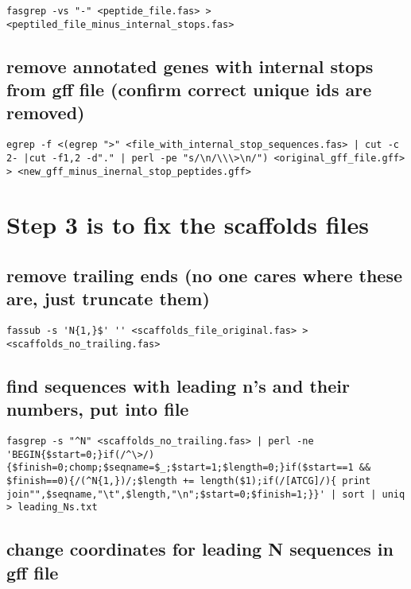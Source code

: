 \documentclass[11pt]{article}
\begin{document}
\begin{verbatim}
fasgrep -vs "-" <peptide_file.fas> > <peptiled_file_minus_internal_stops.fas>
\end{verbatim}


\subsection*{remove annotated genes with internal stops from gff file (confirm correct unique ids are removed)}
\label{sec-2.3}


\begin{verbatim}
egrep -f <(egrep ">" <file_with_internal_stop_sequences.fas> | cut -c 2- |cut -f1,2 -d"." | perl -pe "s/\n/\\\>\n/") <original_gff_file.gff> > <new_gff_minus_inernal_stop_peptides.gff>
\end{verbatim}


\section*{Step 3 is to fix the scaffolds files}
\label{sec-3}

\subsection*{remove trailing ends (no one cares where these are, just truncate them)}
\label{sec-3.1}


\begin{verbatim}
fassub -s 'N{1,}$' '' <scaffolds_file_original.fas> > <scaffolds_no_trailing.fas>
\end{verbatim}


\subsection*{find sequences with leading n's and their numbers, put into file}
\label{sec-3.2}


\begin{verbatim}
fasgrep -s "^N" <scaffolds_no_trailing.fas> | perl -ne 'BEGIN{$start=0;}if(/^\>/){$finish=0;chomp;$seqname=$_;$start=1;$length=0;}if($start==1 && $finish==0){/(^N{1,})/;$length += length($1);if(/[ATCG]/){ print join"",$seqname,"\t",$length,"\n";$start=0;$finish=1;}}' | sort | uniq > leading_Ns.txt
\end{verbatim}


\subsection*{change coordinates for leading N sequences in gff file}
\label{sec-3.3}
\end{document}
